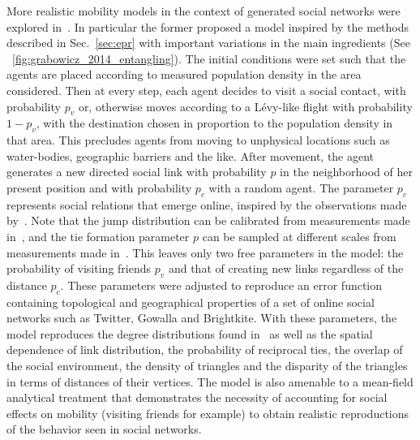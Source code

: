 More realistic mobility models in the context of generated social networks were explored in~\cite{grabowicz_2014_entangling,toole_2015_coupling}. In particular the former proposed a model inspired by the methods described in Sec.~\ref{sec:epr} with important variations in the main ingredients (See \figurename~\ref{fig:grabowicz_2014_entangling}). The initial conditions were set such that the agents are placed according to measured population density in the area considered. Then at every step, each agent decides to visit a social contact, with probability $p_v$ or, otherwise moves according to a L\'evy-like flight with probability $1-p_v$, with the destination chosen in proportion to the population density in that area. This precludes agents from moving to unphysical locations such as water-bodies, geographic barriers and the like. After movement, the agent generates a new directed social link with probability $p$ in the neighborhood of her present position and with probability $p_c$ with a random agent. The parameter $p_c$ represents social relations that emerge online, inspired by the observations made by~\cite{liben-nowell_2005_geographic}. Note that the  jump distribution can be calibrated from measurements made in~\cite{song_2010_modelling}, and the tie formation parameter $p$ can be sampled at different scales from measurements made in~\cite{crandall_2010_inferring}. 
This leaves only two free parameters in the model: the probability of visiting friends $p_v$ and that of creating new links regardless of the distance $p_c$. These parameters were adjusted to reproduce an error function containing topological and  geographical properties of a set of online social networks such as Twitter, Gowalla and Brightkite. With these parameters, the model reproduces the degree distributions found in~\cite{gonzalez_2006_system} as well as the spatial dependence of link distribution, the probability of reciprocal ties, the overlap of the social environment, the density of triangles and the disparity of the triangles in terms of distances of their vertices. The model is also amenable to a  mean-field analytical treatment that demonstrates the necessity of accounting for social effects on mobility (visiting friends for example) to obtain realistic reproductions of the behavior seen in  social networks. 

